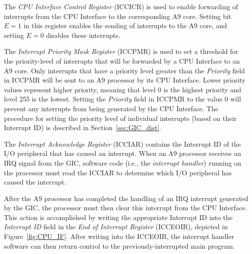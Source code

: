 \documentclass[11pt, twoside, pdftex]{article}
\begin{document}
The {\it CPU Interface Control Register} (ICCICR) is used to enable forwarding of
interrupts from the CPU Interface to the corresponding A9 core. 
Setting bit $E=1$ in this register enables the sending
of interrupts to the A9 core, and setting $E=0$ disables these interrupts. 

The {\it Interrupt Priority Mask Register} (ICCPMR) is used to set a threshold for the 
priority-level of interrupts that will be forwarded by a CPU Interface to an A9 core. 
Only interrupts that
have a priority level greater than the {\it Priority} field in ICCPMR will be sent to an
A9 processor by its CPU Interface. Lower priority values represent higher priority,
meaning that level 0 is the highest priority and level 255 is the lowest. Setting the 
{\it Priority} field in ICCPMR to the value 0 will prevent any interrupts from being
generated by the CPU Interface. The procedure for setting the priority level of individual
interrupts (based on their Interrupt ID) is described in Section~\ref{sec:GIC_dist}.

The {\it Interrupt Acknowledge Register} (ICCIAR) contains the Interrupt ID of the
I/O peripheral that has caused an interrupt.  When an A9 processor receives an IRQ
signal from the GIC, software code (i.e., the {\it interrupt handler}) running on the 
processor must read the ICCIAR to determine which I/O peripheral has caused the interrupt. 

After the A9 processor has completed the handling of an IRQ interrupt generated by the
GIC, the processor must then clear this interrupt from the CPU Interface. This action is
accomplished by writing the appropriate Interrupt ID into the {\it Interrupt ID} field in the 
{\it End of Interrupt Register} (ICCEOIR), depicted in Figure~\ref{fig:CPU_IF}.
After writing into the ICCEOIR, the interrupt handler software can then
return control to the previously-interrupted main program.
\end{document}
